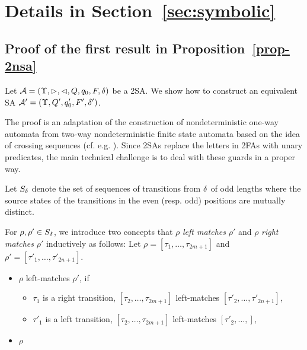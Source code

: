 \section{Details in Section~\ref{sec:symbolic}}\label{app-sym}

\subsection{Proof of the first result in Proposition~\ref{prop-2nsa}}

Let $\mathcal{A} = (\Upsilon, \vartriangleright, \vartriangleleft, Q, q_0, F, \delta)$ be a 2SA. We show how to construct an equivalent SA $\mathcal{A}' =  (\Upsilon, Q', q'_0, F', \delta')$.

The proof is an adaptation of the  construction of nondeterministic one-way automata from two-way nondeterministic finite state automata based on the idea of crossing sequences (cf. e.g. \cite{HU79}). Since 2SAs replace the letters in 2FAs with unary predicates, the main technical challenge is to deal with these guards in a proper way.

Let $S_{\delta}$ denote the set of sequences of transitions from $\delta$ of odd lengths where the source states of the transitions in the even (resp. odd) positions are mutually distinct. 


For $\rho, \rho' \in S_{\delta}$, we introduce two concepts that $\rho$  \emph{left matches} $\rho'$ and $\rho$  \emph{right matches} $\rho'$  inductively as follows: Let $\rho = [\tau_1, \ldots, \tau_{2m+1}]$ and $\rho' = [\tau'_1, \ldots, \tau'_{2n+1}]$. 
\begin{itemize}
\item $\rho$ left-matches $\rho'$, if 
\begin{itemize}
\item $\tau_1$ is a right transition, $[\tau_2,\ldots, \tau_{2m+1}]$ left-matches $[\tau'_2, \ldots, \tau'_{2n+1}]$, 
%
\item $\tau'_1$ is a left transition, $[\tau_2, \ldots, \tau_{2m+1}]$ left-matches $[\tau'_2, \ldots, ]$, 
\end{itemize} 
\item $\rho$ 
\end{itemize}

